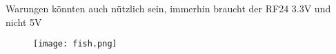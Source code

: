 \documentclass[12pt]{article}
\begin{document}
\begin{warn}[Notice:]
  Warungen könnten auch nützlich sein, immerhin braucht der RF24 3.3V und nicht 5V
\end{warn}


\begin{figure}[h]
	\texttt{[image: fish.png]}
	\centering
\end{figure}






\end{document}
